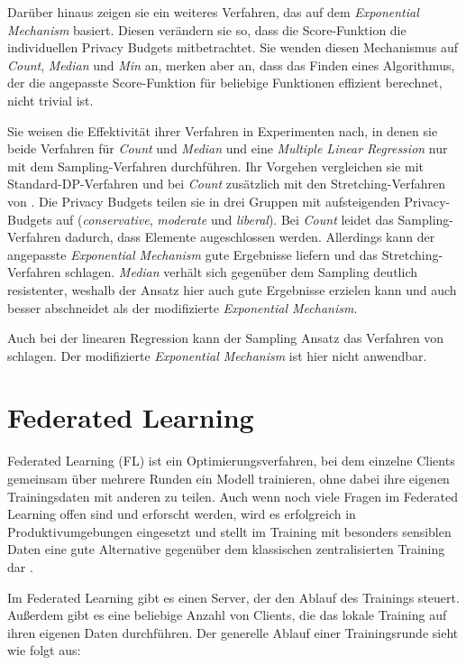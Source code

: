 Darüber hinaus zeigen sie ein weiteres Verfahren, das auf dem \textit{Exponential Mechanism} basiert. Diesen verändern sie so, dass die Score-Funktion die individuellen Privacy Budgets mitbetrachtet. Sie wenden diesen Mechanismus auf \textit{Count}, \textit{Median} und \textit{Min} an, merken aber an, dass das Finden eines Algorithmus, der die angepasste Score-Funktion für beliebige Funktionen effizient berechnet, nicht trivial ist.

Sie weisen die Effektivität ihrer Verfahren in Experimenten nach, in denen sie beide Verfahren für \textit{Count} und \textit{Median} und eine \textit{Multiple Linear Regression} nur mit dem Sampling-Verfahren durchführen. Ihr Vorgehen vergleichen sie mit Standard-DP-Verfahren und bei \textit{Count} zusätzlich mit den Stretching-Verfahren von \textcite{alaggan:2016}. Die Privacy Budgets teilen sie in drei Gruppen mit aufsteigenden Privacy-Budgets auf (\textit{conservative}, \textit{moderate} und \textit{liberal}). Bei \textit{Count} leidet das Sampling-Verfahren dadurch, dass Elemente augeschlossen werden. Allerdings kann der angepasste \textit{Exponential Mechanism} gute Ergebnisse liefern und das Stretching-Verfahren schlagen. \textit{Median} verhält sich gegenüber dem Sampling deutlich resistenter, weshalb der Ansatz hier auch gute Ergebnisse erzielen kann und auch besser abschneidet als der modifizierte \textit{Exponential Mechanism}. 

Auch bei der linearen Regression kann der Sampling Ansatz das Verfahren von \cite{alaggan:2016} schlagen. Der modifizierte \textit{Exponential Mechanism} ist hier nicht anwendbar.

\section{Federated Learning}\label{fund-fl}

Federated Learning (FL) ist ein Optimierungsverfahren, bei dem einzelne Clients gemeinsam über mehrere Runden ein Modell trainieren, ohne dabei ihre eigenen Trainingsdaten mit anderen zu teilen. Auch wenn noch viele Fragen im Federated Learning offen sind und erforscht werden, wird es erfolgreich in Produktivumgebungen eingesetzt und stellt im Training mit besonders sensiblen Daten eine gute Alternative gegenüber dem klassischen zentralisierten Training dar \cite{hard:2018, ramaswamy:2020}.

Im Federated Learning gibt es einen Server, der den Ablauf des Trainings steuert. Außerdem gibt es eine beliebige Anzahl von Clients, die das lokale Training auf ihren eigenen Daten durchführen. Der generelle Ablauf einer Trainingsrunde sieht wie folgt aus: 

